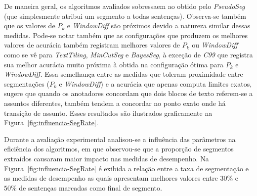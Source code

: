 De maneira geral, os algoritmos avaliados sobressaem ao obtido pelo \textit{PseudoSeg} (que simplesmente atribui um segmento a todas sentenças). Observa-se também que os valores de $P_k$ e \textit{WindowDiff} são próximos devido a natureza similar dessas medidas. Pode-se notar também que as configurações que produzem os melhores valores de acurácia também registram melhores valores de $P_k$ ou \textit{WindowDiff} como se vê para \textit{TextTiling}, \textit{MinCutSeg} e \textit{BayesSeg}, à exceção de \textit{C99} que registra sua melhor acurácia muito próxima à obtida na configuração ótima para $P_k$ e \textit{WindowDiff.} 
Essa semelhança entre as medidas que toleram proximidade entre segmentações ($P_k$  e \textit{WindowDiff}) e a acurácia que apenas computa limites exatos, sugere que quando os anotadores concordam que dois blocos de texto referem-se a assuntos diferentes, também tendem a concordar no ponto exato onde há transição de assunto.  Esses resultados são ilustrados graficamente na Figura~\ref{fig:influencia-SegRate}.











Durante a avaliação experimental analisou-se a influência das parâmetros na eficiência dos algoritmos, em que observou-se que a proporção de segmentos extraídos causaram maior impacto nas medidas de desempenho. Na Figura~\ref{fig:influencia-SegRate} é exibida a relação entre a taxa de segmentação e as medidas de desempenho as quais apresentam melhores valores entre $30\%$ e $50\%$ de sentenças marcadas como final de segmento.



